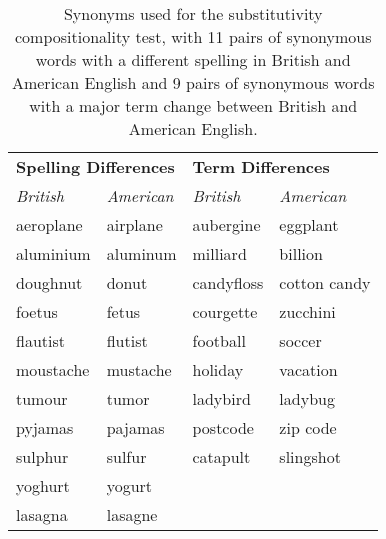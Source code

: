 \begin{table}[!t]
\small\centering
\begin{tabular}{ll|ll}
    \toprule
    \multicolumn{2}{l|}{\textbf{Spelling Differences}} & \multicolumn{2}{l}{\textbf{Term Differences}} \\
    \textit{British} & \textit{American} & \textit{British} & \textit{American} \\ \midrule \midrule
    aeroplane & airplane & aubergine & eggplant  \\
    aluminium & aluminum & milliard & billion  \\
    doughnut & donut & candyfloss & cotton candy \\
    foetus & fetus & courgette & zucchini \\
    flautist & flutist & football & soccer   \\
    moustache & mustache  & holiday & vacation   \\
    tumour & tumor  & ladybird & ladybug \\
    pyjamas & pajamas  & postcode & zip code  \\
    sulphur & sulfur   & catapult & slingshot  \\
    yoghurt & yogurt \\
    lasagna & lasagne \\
    \bottomrule
\end{tabular}
    \caption{Synonyms used for the substitutivity compositionality test, with 11 pairs of synonymous words with a different spelling in British and American English and 9 pairs of synonymous words with a major term change between British and American English.}\label{tab:synonyms}
\end{table}
